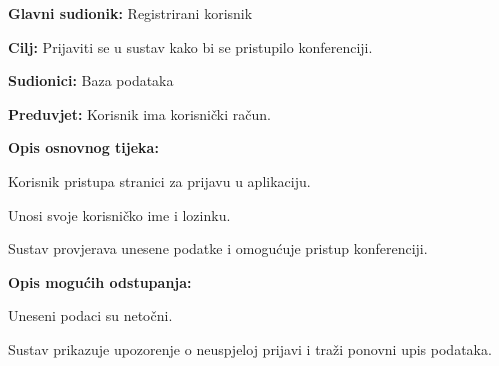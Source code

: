					\noindent {}
					\begin{packed_item}
						
						\item \textbf{Glavni sudionik: }Registrirani korisnik
						\item  \textbf{Cilj:} Prijaviti se u sustav kako bi se pristupilo konferenciji.
						\item  \textbf{Sudionici:} Baza podataka
						\item  \textbf{Preduvjet:} Korisnik ima korisnički račun.
						\item  \textbf{Opis osnovnog tijeka:}
						
						\item[] \begin{packed_enum}
							
							\item Korisnik pristupa stranici za prijavu u aplikaciju.
							\item Unosi svoje korisničko ime i lozinku.
							\item Sustav provjerava unesene podatke i omogućuje pristup konferenciji.
						\end{packed_enum}
						
						\item  \textbf{Opis mogućih odstupanja:}
						
						\item[] \begin{packed_item}
							
							\item[3.a] Uneseni podaci su netočni.
							\item[] \begin{packed_enum}
								
								\item Sustav prikazuje upozorenje o neuspjeloj prijavi i traži ponovni upis podataka.
								
							\end{packed_enum}

						\end{packed_item}
					\end{packed_item}
					

